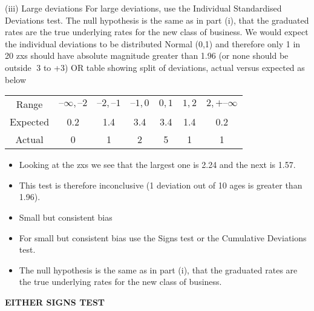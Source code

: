 \documentclass[a4paper,12pt]{article}
\begin{document}
(iii) Large deviations
For large deviations, use the Individual Standardised Deviations test.
The null hypothesis is the same as in part (i), that the graduated rates are the
true underlying rates for the new class of business.
We would expect the individual deviations to be distributed Normal (0,1)
and therefore only 1 in 20 zxs should have absolute magnitude greater than
1.96 (or none should be outside 3 to +3)
OR table showing split of deviations, actual versus expected
as below


\begin{center}
\begin{tabular}{ccccccc}
Range  & $–\infty,–2 $ & $  –2,–1 $ & $ –1,0$ & $ 0,1 $ & $1,2 $ & $2,+–\infty$ \\
Expected & 0.2 & 1.4 & 3.4 & 3.4 & 1.4 & 0.2 \\
Actual & 0 & 1 & 2 & 5 & 1 & 1\\
\end{tabular}
\end{center}

\begin{itemize}
    \item Looking at the zxs we see that the largest one is 2.24 and the next is 1.57.
\item This test is therefore inconclusive (1 deviation out of 10 ages is greater
than 1.96).
\item Small but consistent bias
\item For small but consistent bias use the Signs test or the Cumulative Deviations
test.
\item The null hypothesis is the same as in part (i), that the graduated rates are the
true underlying rates for the new class of business.
\end{itemize}

\newpage
\noindent \textbf{EITHER SIGNS TEST}
\end{document}
